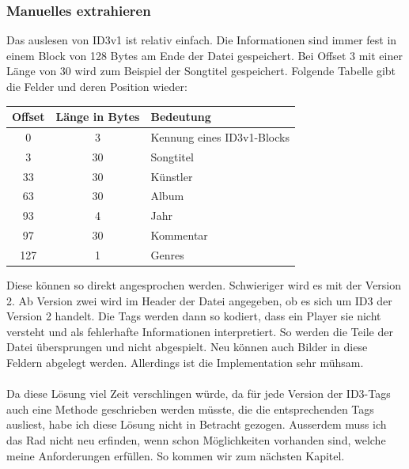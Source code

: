 \documentclass[12pt,a4paper,ngerman]{report}
\begin{document}
\subsubsection*{Manuelles extrahieren}
Das auslesen von ID3v1 ist relativ einfach. Die Informationen sind immer fest in einem Block von 128 Bytes am Ende der Datei gespeichert. Bei Offset 3 mit einer Länge von 30 wird zum Beispiel der Songtitel gespeichert. Folgende Tabelle gibt die Felder und deren Position wieder:\\
\begin{tabular}{|c|c|l|} \hline
 \textbf{Offset} & \textbf{Länge in Bytes} & \textbf{Bedeutung}\\
 \hline
 0 & 3 & Kennung eines ID3v1-Blocks\\ \hline
 3 & 30 & Songtitel\\ \hline
 33 & 30 & Künstler\\ \hline
 63 & 30 & Album\\ \hline
 93 & 4 & Jahr\\ \hline
 97 & 30 & Kommentar\\ \hline
 127 & 1 & Genres\\ \hline
\end{tabular}
Diese können so direkt angesprochen werden. Schwieriger wird es mit der Version 2. Ab Version zwei wird im Header der Datei angegeben, ob es sich um ID3 der Version 2 handelt. Die Tags werden dann so kodiert, dass ein Player sie nicht versteht und als fehlerhafte Informationen interpretiert. So werden die Teile der Datei übersprungen und nicht abgespielt. Neu können auch Bilder in diese Feldern abgelegt werden. Allerdings ist die Implementation sehr mühsam.
\\
\\
Da diese Lösung viel Zeit verschlingen würde, da für jede Version der ID3-Tags auch eine Methode geschrieben werden müsste, die die entsprechenden Tags ausliest, habe ich diese Lösung nicht in Betracht gezogen. Ausserdem muss ich das Rad nicht neu erfinden, wenn schon Möglichkeiten vorhanden sind, welche meine Anforderungen erfüllen. So kommen wir zum nächsten Kapitel.
\end{document}
